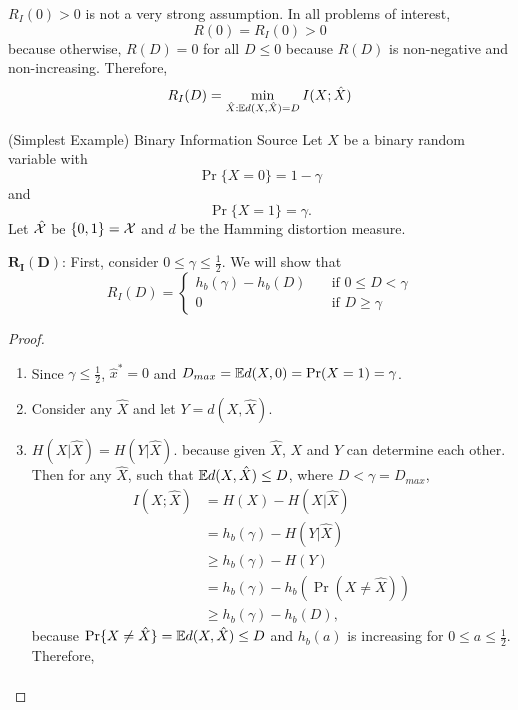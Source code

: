 \documentclass[../main.tex]{subfiles}
\begin{document}
\begin{remark}
    $R_I(0)>0$ is not a very strong assumption. In all problems of interest, \[
    R(0) = R_I(0) > 0
    \] because otherwise, $R(D)=0$ for all $D\leq 0$ because $R(D)$ is non-negative and non-increasing. Therefore,\[
    R_I(D) = \min_{\hat X: \mathbb{E} d(X,\hat X)=D}I(X;\hat X)
    \]
\end{remark}
\begin{pbox}{(Simplest Example) Binary Information Source}
    Let $X$ be a binary random variable with \[
    \Pr\{X=0\}=1-\gamma
    \] and \[
    \Pr\{X=1\} = \gamma.
    \] Let $\hat {\mathcal{X}}$ be $\{0,1\}=\mathcal{X}$ and $d$ be the Hamming distortion measure.
    
    $\boldsymbol{R_I(D)}$:
    \newline
    First, consider $0\leq \gamma \leq \frac{1}{2}.$ We will show that \[
    R_I(D)=\begin{cases}
        h_b(\gamma) - h_b(D) \quad &\text{if $0\leq D < \gamma$}\\
        0 \quad &\text{if $D \geq \gamma$}
    \end{cases}
    \]
    \begin{proof}
        \begin{enumerate}
            \item Since $\gamma \leq \frac{1}{2}$, $\hat x^* = 0$ and $D_{max}=\mathbb{E} d(X,0)=\Pr(X=1)=\gamma$.
            \item Consider any $\hat X$ and let $Y=d(X,\hat X).$
            \item $H(X|\hat X)=H(Y|\hat X).$ because given $\hat X$, $X$ and $Y$ can determine each other.
            \newline
            Then for any $\hat X$, such that $\mathbb{E} d(X,\hat X)\leq D$, where $D< \gamma =D_{max}$, \begin{align*}
                I(X;\hat X) &= H(X)-H(X|\hat X)\\
                &= h_b(\gamma) - H(Y|\hat X)\\
                &\geq h_b(\gamma) - H(Y) \\
                &= h_b(\gamma) - h_b(\Pr(X\neq \hat X))\\
                &\geq h_b(\gamma) - h_b(D),
            \end{align*}
            because $\Pr\{X\neq \hat X\}=\mathbb{E} d(X,\hat X)\leq D$ and $h_b(a)$ is increasing for $0\leq a\leq \frac{1}{2}.$
            \newline
            Therefore, \begin{align*}

\end{align*}
\end{enumerate}
\end{proof}
\end{pbox}
\end{document}
